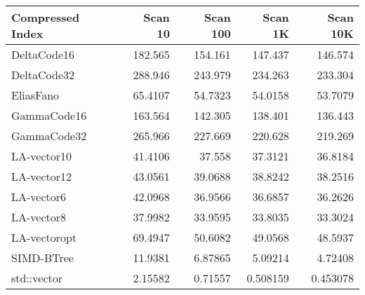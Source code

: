\begin{tabular}{lrrrr}
\hline
 Compressed Index   &   Scan 10 &   Scan 100 &    Scan 1K &   Scan 10K \\
\hline
 DeltaCode16        & 182.565   &  154.161   & 147.437    & 146.574    \\
 DeltaCode32        & 288.946   &  243.979   & 234.263    & 233.304    \\
 EliasFano          &  65.4107  &   54.7323  &  54.0158   &  53.7079   \\
 GammaCode16        & 163.564   &  142.305   & 138.401    & 136.443    \\
 GammaCode32        & 265.966   &  227.669   & 220.628    & 219.269    \\
 LA-vector10        &  41.4106  &   37.558   &  37.3121   &  36.8184   \\
 LA-vector12        &  43.0561  &   39.0688  &  38.8242   &  38.2516   \\
 LA-vector6         &  42.0968  &   36.9566  &  36.6857   &  36.2626   \\
 LA-vector8         &  37.9982  &   33.9595  &  33.8035   &  33.3024   \\
 LA-vectoropt       &  69.4947  &   50.6082  &  49.0568   &  48.5937   \\
 SIMD-BTree         &  11.9381  &    6.87865 &   5.09214  &   4.72408  \\
 std::vector        &   2.15582 &    0.71557 &   0.508159 &   0.453078 \\
\hline
\end{tabular}